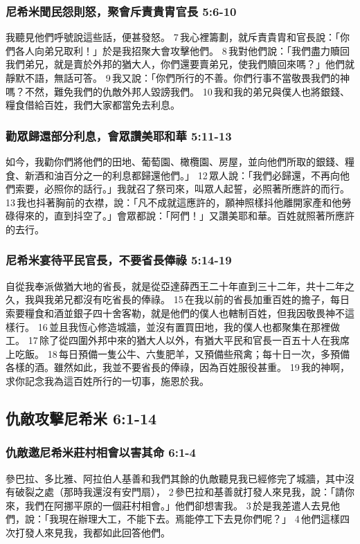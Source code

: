 \subsubsection{尼希米聞民怨則怒，聚會斥責貴胄官長 5:6-10}
我聽見他們呼號說這些話，便甚發怒。 7 我心裡籌劃，就斥責貴胄和官長說：「你們各人向弟兄取利！」於是我招聚大會攻擊他們。 8 我對他們說：「我們盡力贖回我們弟兄，就是賣於外邦的猶大人，你們還要賣弟兄，使我們贖回來嗎？」他們就靜默不語，無話可答。 9 我又說：「你們所行的不善。你們行事不當敬畏我們的神嗎？不然，難免我們的仇敵外邦人毀謗我們。 10 我和我的弟兄與僕人也將銀錢、糧食借給百姓，我們大家都當免去利息。

\subsubsection{勸眾歸還部分利息，會眾讚美耶和華 5:11-13}
如今，我勸你們將他們的田地、葡萄園、橄欖園、房屋，並向他們所取的銀錢、糧食、新酒和油百分之一的利息都歸還他們。」 12 眾人說：「我們必歸還，不再向他們索要，必照你的話行。」我就召了祭司來，叫眾人起誓，必照著所應許的而行。 13 我也抖著胸前的衣襟，說：「凡不成就這應許的，願神照樣抖他離開家產和他勞碌得來的，直到抖空了。」會眾都說：「阿們！」又讚美耶和華。百姓就照著所應許的去行。

\subsubsection{尼希米宴待平民官長，不要省長俸祿 5:14-19}
自從我奉派做猶大地的省長，就是從亞達薛西王二十年直到三十二年，共十二年之久，我與我弟兄都沒有吃省長的俸祿。 15 在我以前的省長加重百姓的擔子，每日索要糧食和酒並銀子四十舍客勒，就是他們的僕人也轄制百姓，但我因敬畏神不這樣行。 16 並且我恆心修造城牆，並沒有置買田地，我的僕人也都聚集在那裡做工。 17 除了從四圍外邦中來的猶大人以外，有猶大平民和官長一百五十人在我席上吃飯。 18 每日預備一隻公牛、六隻肥羊，又預備些飛禽；每十日一次，多預備各樣的酒。雖然如此，我並不要省長的俸祿，因為百姓服役甚重。 19 我的神啊，求你記念我為這百姓所行的一切事，施恩於我。

\subsection{仇敵攻擊尼希米 6:1-14}
\subsubsection{仇敵邀尼希米莊村相會以害其命 6:1-4}
參巴拉、多比雅、阿拉伯人基善和我們其餘的仇敵聽見我已經修完了城牆，其中沒有破裂之處（那時我還沒有安門扇）， 2 參巴拉和基善就打發人來見我，說：「請你來，我們在阿挪平原的一個莊村相會。」他們卻想害我。 3 於是我差遣人去見他們，說：「我現在辦理大工，不能下去。焉能停工下去見你們呢？」 4 他們這樣四次打發人來見我，我都如此回答他們。


